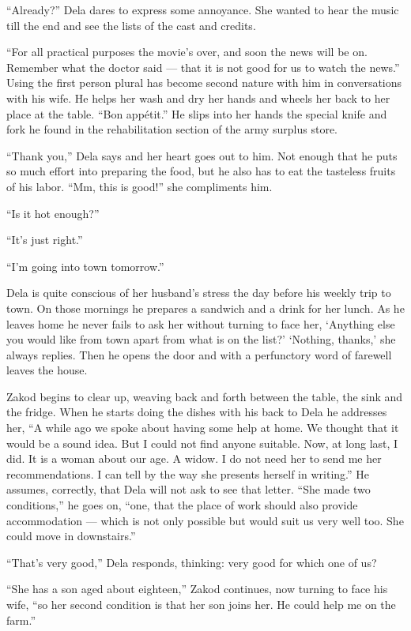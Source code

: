 \documentclass[twoside,11pt,openany]{book}
\begin{document}
``Already?'' Dela dares to express some annoyance. She wanted to hear the music till the end
and see the lists of the cast and credits.

``For all practical purposes the movie's over, and soon the news will be on. Remember what the doctor said
--- that it is not good for us to watch the news.'' Using the first person plural has become second nature
with him in conversations with his wife. He helps her wash and dry her hands and wheels her back to her place at the
table. ``Bon app\'etit.'' He slips into her hands the special knife and fork he found in the
rehabilitation section of the army surplus store.

``Thank you,'' Dela says and her heart goes out to him. Not enough that he puts so much effort
into preparing the food, but he also has to eat the tasteless fruits of his labor. ``Mm, this is good!''
she compliments him.

``Is it hot enough?''

``It's just right.''

``I'm going into town tomorrow.''

Dela is quite conscious of her husband's stress the day before his weekly trip to town. On those mornings he prepares a
sandwich and a drink for her lunch. As he leaves home he never fails to ask her without turning to face her, `Anything
else you would like from town apart from what is on the list?'  `Nothing, thanks,' she always replies. Then he
opens the door and with a perfunctory word of farewell leaves the house.

Zakod begins to clear up, weaving back and forth between the table, the sink and the fridge. When he starts doing the
dishes with his back to Dela he addresses her, ``A while ago we spoke about having some help at home. We
thought that it would be a sound idea. But I could not find anyone suitable. Now, at long last, I did. It is a woman
about our age. A widow.  I do not need her to send me her recommendations. I can tell by the way she presents herself
in writing.''  He assumes, correctly, that Dela will not ask to see that letter.  ``She
made two conditions,'' he goes on, ``one, that the place of work should also provide accommodation --- which
is not only possible but would suit us very well too.  She could move in downstairs.''

``That's very good,'' Dela responds, thinking: very good for which one of us?

``She has a son aged about eighteen,'' Zakod continues, now turning to face his wife,
``so her second condition is that her son joins her. He could help me on the farm.''
\end{document}
